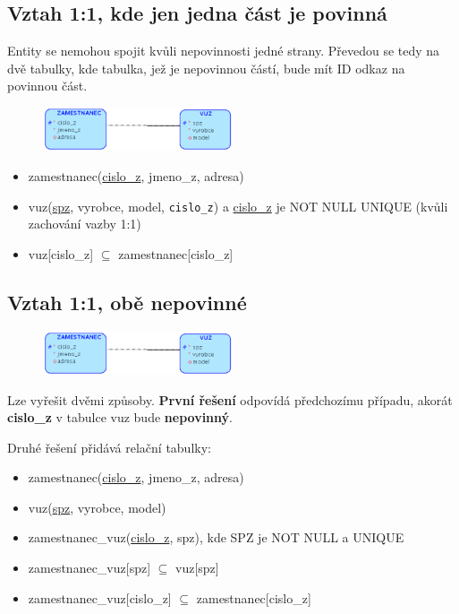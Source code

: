 \documentclass{szzclass}
\begin{document}
\newpage

\subsection{Vztah 1:1, kde jen jedna část je povinná}
Entity se nemohou spojit kvůli nepovinnosti jedné strany. Převedou se tedy na dvě tabulky, kde tabulka, jež je nepovinnou částí, bude mít ID
odkaz na povinnou část.
\begin{figure}[h!]
    \centering
    \includegraphics[width=0.5\textwidth]{topics/bi-wsi-si-02/images/oneToOneV2.png}
\end{figure}
\begin{itemize}
    \item zamestnanec(\underline{cislo\_z}, jmeno\_z, adresa)
    \item vuz(\underline{spz}, vyrobce, model, \texttt{cislo\_z}) a \underline{cislo\_z} je NOT NULL UNIQUE (kvůli zachování vazby 1:1)
    \item vuz[cislo\_z] $\subseteq$ zamestnanec[cislo\_z] 
\end{itemize}

\subsection{Vztah 1:1, obě nepovinné}
\begin{figure}[h!]
    \centering
    \includegraphics[width=0.5\textwidth]{topics/bi-wsi-si-02/images/oneToOneV2.png}
\end{figure}
Lze vyřešit dvěmi způsoby. \textbf{První řešení} odpovídá předchozímu případu, akorát \textbf{cislo\_z} v tabulce vuz bude \textbf{nepovinný}.

Druhé řešení přidává relační tabulky:
\begin{itemize}
    \item zamestnanec(\underline{cislo\_z}, jmeno\_z, adresa)
    \item vuz(\underline{spz}, vyrobce, model)
    \item zamestnanec\_vuz(\underline{cislo\_z}, spz), kde SPZ je NOT NULL a UNIQUE
    \item zamestnanec\_vuz[spz] $\subseteq$ vuz[spz]
    \item zamestnanec\_vuz[cislo\_z] $\subseteq$ zamestnanec[cislo\_z] 
\end{itemize}
\end{document}
